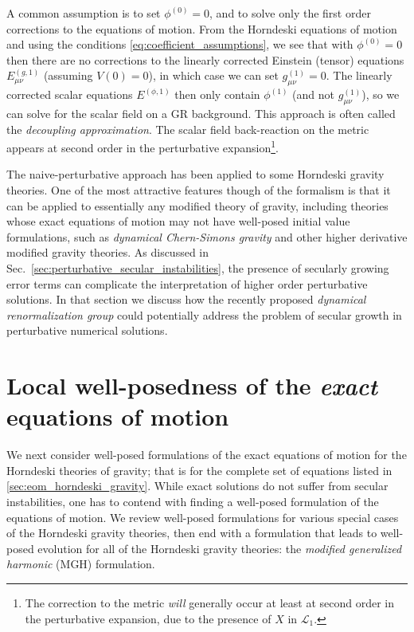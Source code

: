 \documentclass{ws-ijmpd}
\begin{document}
A common assumption is to set $\phi^{(0)}=0$, and to solve only the first
order corrections to the equations of motion.
From the Horndeski equations of motion and using the
conditions \eqref{eq:coefficient_assumptions}, 
we see that with $\phi^{(0)}=0$
then there are no corrections to the linearly corrected
Einstein (tensor) equations $E^{(g,1)}_{\mu\nu}$
(assuming $V(0)=0$), in which case we can set 
$g_{\mu\nu}^{(1)}=0$.
The linearly corrected
scalar equations $E^{(\phi,1)}$
then only contain $\phi^{(1)}$ (and not $g_{\mu\nu}^{(1)}$), so we
can solve for the scalar field on a GR background.
This approach is often called the \emph{decoupling approximation}.
The scalar field back-reaction on the metric appears at second order
in the perturbative expansion\footnote{The correction to the
metric \emph{will} generally 
occur at least at second order in the perturbative expansion,
due to the presence of $X$ in $\mathcal{L}_1$.}.

The naive-perturbative approach has been applied to some Horndeski 
gravity theories\cite{Witek:2018dmd,Okounkova:2019zep,Okounkova:2020rqw}.
One of the most attractive features though of the formalism is that
it can be applied to essentially any modified theory of gravity,
including theories whose exact equations of motion may not 
have well-posed initial value formulations, such
as \emph{dynamical Chern-Simons gravity}\cite{Alexander:2009tp,
Yunes:2013dva,Delsate:2014hba,
Okounkova:2017yby,Okounkova:2018abo,Okounkova:2018pql} 
and other higher derivative modified gravity 
theories\cite{Endlich:2017tqa,Cayuso:2020lca}.
As discussed in Sec.~\ref{sec:perturbative_secular_instabilities}, 
the presence of secularly growing
error terms can complicate the interpretation of higher order
perturbative solutions.
In that section 
we discuss how the recently proposed
\emph{dynamical renormalization group} could potentially address
the problem of secular growth in perturbative numerical solutions.

\section{Local well-posedness of the \emph{exact} equations of motion
\label{sec:local_well_posedness_exact_eom}
}
We next consider well-posed formulations of the exact
equations of motion for the Horndeski theories of gravity; that is
for the complete set of equations listed in \ref{sec:eom_horndeski_gravity}.
While exact solutions do not suffer from secular instabilities, 
one has to contend with finding a well-posed formulation of
the equations of motion. We review well-posed formulations
for various special cases of the Horndeski gravity theories, then
end with a formulation that leads to well-posed evolution
for all of the Horndeski gravity theories: the \emph{modified
generalized harmonic} (MGH) formulation\cite{Kovacs:2020pns,Kovacs:2020ywu}.
\end{document}
